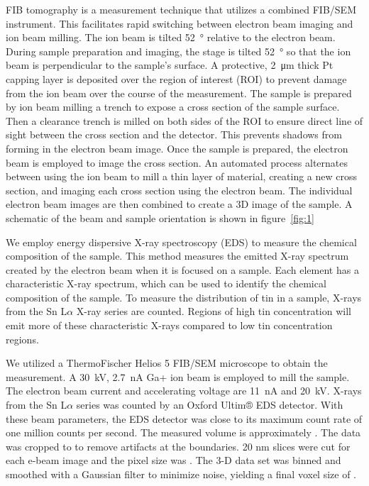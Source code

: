 FIB tomography is a measurement technique that utilizes a combined FIB/SEM instrument. This facilitates rapid switching between electron beam imaging and ion beam milling. The ion beam is tilted \qty{52}{\degree} relative to the electron beam. During sample preparation and imaging, the stage is tilted \qty{52}{\degree} so that the ion beam is perpendicular to the sample's surface. A protective, \qty{2}{\micro\meter} thick Pt capping layer is deposited over the region of interest (ROI) to prevent damage from the ion beam over the course of the measurement. The sample is prepared by ion beam milling a trench to expose a cross section of the sample surface. Then a clearance trench is milled on both sides of the ROI to ensure direct line of sight between the cross section and the detector. This prevents shadows from forming in the electron beam image. Once the sample is prepared, the electron beam is employed to image the cross section. An automated process alternates between using the ion beam to mill a thin layer of material, creating a new cross section, and imaging each cross section using the electron beam. The individual electron beam images are then combined to create a 3D image of the sample. A schematic of the beam and sample orientation is shown in figure~\ref{fig:1}

We employ energy dispersive X-ray spectroscopy (EDS) to measure the chemical composition of the sample. This method measures the emitted X-ray spectrum created by the electron beam when it is focused on a sample. Each element has a characteristic X-ray spectrum, which can be used to identify the chemical composition of the sample. To measure the distribution of tin in a sample, X-rays from the Sn L$\alpha$ X-ray series are counted. Regions of high tin concentration will emit more of these characteristic X-rays compared to low tin concentration regions.

We utilized a ThermoFischer Helios 5 FIB/SEM microscope to obtain the measurement. A \qty{30}{\kilo\volt}, \qty{2.7}{\nano\ampere} Ga+ ion beam is employed to mill the sample. The electron beam current and accelerating voltage are \qty{11}{\nano\ampere} and \qty{20}{\kilo\volt}. X-rays from the Sn L$\alpha$ series was counted by an Oxford Ultim® EDS detector. With these beam parameters, the EDS detector was close to its maximum count rate of one million counts per second. The measured volume is approximately . The data was cropped to  to remove artifacts at the boundaries.  20 nm slices were cut for each e-beam image and the pixel size was . The 3-D data set was binned and smoothed with a Gaussian filter to minimize noise, yielding a final voxel size of .

